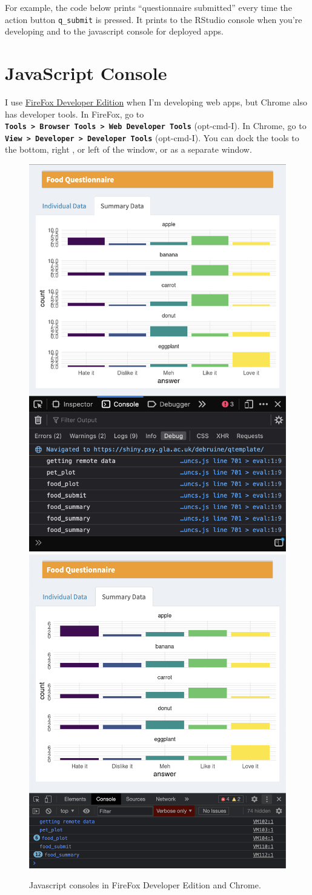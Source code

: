 \documentclass[
]{book}
\newenvironment{Shaded}{\begin{snugshade}}{\end{snugshade}}
\newcommand{\CommentTok}[1]{\textcolor[rgb]{0.56,0.35,0.01}{\textit{#1}}}
\newcommand{\FunctionTok}[1]{\textcolor[rgb]{0.00,0.00,0.00}{#1}}
\newcommand{\NormalTok}[1]{#1}
\newcommand{\SpecialCharTok}[1]{\textcolor[rgb]{0.00,0.00,0.00}{#1}}
\newcommand{\StringTok}[1]{\textcolor[rgb]{0.31,0.60,0.02}{#1}}
\begin{document}
For example, the code below prints ``questionnaire submitted'' every time the action button \texttt{q\_submit} is pressed. It prints to the RStudio console when you're developing and to the javascript console for deployed apps.

\begin{Shaded}
\end{Shaded}

\hypertarget{javascript-console}{%
\section{JavaScript Console}\label{javascript-console}}

I use \href{https://www.mozilla.org/en-US/firefox/developer/}{FireFox Developer Edition} when I'm developing web apps, but Chrome also has developer tools. In FireFox, go to \textbf{\texttt{Tools\ \textgreater{}\ Browser\ Tools\ \textgreater{}\ Web\ Developer\ Tools}} (opt-cmd-I). In Chrome, go to \textbf{\texttt{View\ \textgreater{}\ Developer\ \textgreater{}\ Developer\ Tools}} (opt-cmd-I). You can dock the tools to the bottom, right , or left of the window, or as a separate window.

\begin{figure}

{\centering \includegraphics[width=0.3\linewidth]{images/js_console_firefox} \includegraphics[width=0.3\linewidth]{images/js_console_chrome} 

}

\caption{Javascript consoles in FireFox Developer Edition and Chrome.}\label{fig:js-console}
\end{figure}
\end{document}
